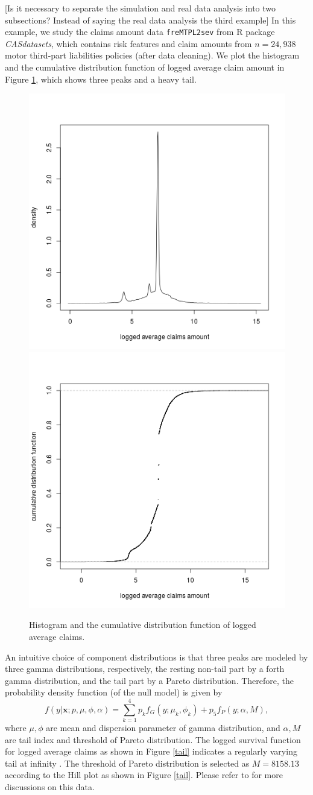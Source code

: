 \documentclass[11pt]{article}
\numberwithin{equation}{section}
\def\bx{\boldsymbol{x}}
\begin{document}
{\color{blue}[Is it necessary to separate the simulation and real data analysis into two subsections? Instead of saying the real data analysis the third example]}
In this example, we study the claims amount data {\tt freMTPL2sev} from R package {\it CASdatasets}, which contains risk features and  claim amounts from $n=24,938$ motor third-part liabilities policies (after data cleaning). 
We plot the histogram and the cumulative distribution function of logged average claim  amount in Figure \ref{hist}, which shows three peaks and a heavy tail. 
	\begin{figure}[h!]
		\centering
		\includegraphics[width=0.4\linewidth]{../plots/sev/hist.png}
		\includegraphics[width=0.4\linewidth]{../plots/sev/cdf.png}
		\caption{Histogram and the cumulative distribution function of logged average claims.}\label{hist}
	\end{figure}
An intuitive choice of component distributions is that 
three peaks are modeled by three gamma distributions, respectively, the resting non-tail part by a forth gamma distribution, and the tail part by a Pareto distribution.
Therefore, the probability density function (of the null model) is given by
\begin{equation}\label{sev-0}
	f(y|\bx;p,\mu,\phi,\alpha)=\sum_{k=1}^4p_kf_{G}(y;\mu_k,\phi_k)+p_5f_{P}(y;\alpha,M),
\end{equation}
	where $\mu,\phi$ are mean and dispersion parameter of gamma distribution, and $\alpha, M$ are tail index and threshold of Pareto distribution. 
	The logged survival function for logged average claims as shown in Figure \ref{tail} indicates a regularly varying  tail at infinity \citep{embrechts2013modelling}.
	The threshold of Pareto distribution is selected as $M=8158.13$ according to the Hill plot \citep{resnick1997heavy} as shown in Figure \ref{tail}. Please refer to \citet{wuthrich2022statistical} for more discussions on this data.
	
\end{document}
